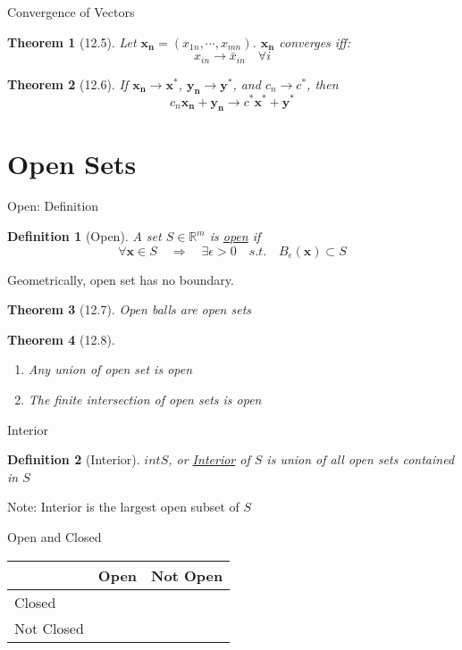 \documentclass[final]{beamer}
\newtheorem{defn}{Definition}
\newtheorem{thm}{Theorem}
\begin{document}
\begin{frame}[t]{Convergence of Vectors}
	\begin{thm}
		[12.5] Let $\mathbf{x_n}=(x_{1n},\cdots,x_{mn})$. $\mathbf{x_n}$ converges iff:
		\[
			x_{in} \rightarrow \bar x_{in} \quad \forall i
		\]
	\end{thm}
	\begin{thm}
		[12.6] If $\mathbf{x_n}\rightarrow\mathbf{x^\ast}$, $\mathbf{y_n} \rightarrow\mathbf{y^\ast}$, and $c_n\rightarrow c^\ast$, then\[
			c_n\mathbf{x_n}+\mathbf{y_n}\rightarrow c^\ast \mathbf{x^\ast} + \mathbf{y^\ast}
		\]
	\end{thm}
\end{frame}

\section{Open Sets} %
\label{sec:open_sets}
\begin{frame}[t]{Open: Definition}
	\begin{defn}
		[Open] A set $S\in\mathbb{R}^m$ is \uline{open} if \[
			\forall \mathbf{x}\in S \quad\Rightarrow\quad \exists \epsilon>0 \quad s.t.\quad B_\epsilon(\mathbf{x})\subset S
		\]
	\end{defn}
	Geometrically, open set has no boundary.
	\begin{thm}
		[12.7] Open balls are open sets
	\end{thm}
	\begin{thm}[12.8]
		\begin{enumerate}
			\item Any union of open set is open
			\item The finite intersection of open sets is open
		\end{enumerate}
	\end{thm}
\end{frame}

\begin{frame}[t]{Interior}
	\begin{defn}
		[Interior]
		$int S$, or \uline{Interior} of $S$ is union of all open sets contained in $S$
	\end{defn}
	Note: Interior is the largest open subset of $S$
	\begin{block}
		{Open and Closed}
		\begin{center}
			\begin{tabular}{l|ll}
			& Open & Not Open\\
			\hline
			Closed &&\\
			Not Closed &&
			\end{tabular}
		\end{center}
	\end{block}
\end{frame}
\end{document}
